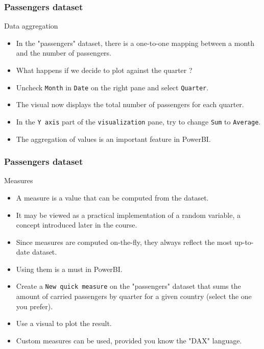 \documentclass[main.tex]{subfiles}
\begin{document}
\begin{frame}
    \frametitle{Passengers dataset}
\begin{block}{Data aggregation}
    \begin{itemize}
        \item<+-> In the "passengers" dataset, there is a one-to-one mapping
        between a month and the number of passengers. 
        \item<+-> What happens if we decide to plot against the quarter ?
        \item<+-> Uncheck \texttt{Month} in \texttt{Date} on the right pane and
        select \texttt{Quarter}.
        \item<+-> The visual now displays the total number of passengers for each quarter.
        \item<+-> In the \texttt{Y axis} part of the \texttt{visualization} pane,
        try to change \texttt{Sum} to \texttt{Average}.
        \item<+-> The aggregation of values is an important feature in PowerBI.
    \end{itemize}
\end{block}
\end{frame}
\begin{frame}
    \frametitle{Passengers dataset}
\begin{block}{Measures}
    \begin{itemize}
        \item<+-> A measure is a value that can be computed from the dataset.
        \item<+-> It may be viewed as a practical implementation of a random variable,
        a concept introduced later in the course.
        \item<+-> Since measures are computed on-the-fly, they always reflect the most up-to-date dataset.
        \item<+-> Using them is a must in PowerBI.
        \item<+-> Create a \texttt{New quick measure} on the "passengers" dataset that sums the amount of 
        carried passengers by quarter for a given country (select the one you prefer).
        \item<+-> Use a visual to plot the result.
        \item<+-> Custom measures can be used, provided you know the "DAX" language.
    \end{itemize}
\end{block}
\end{frame}
\end{document}
